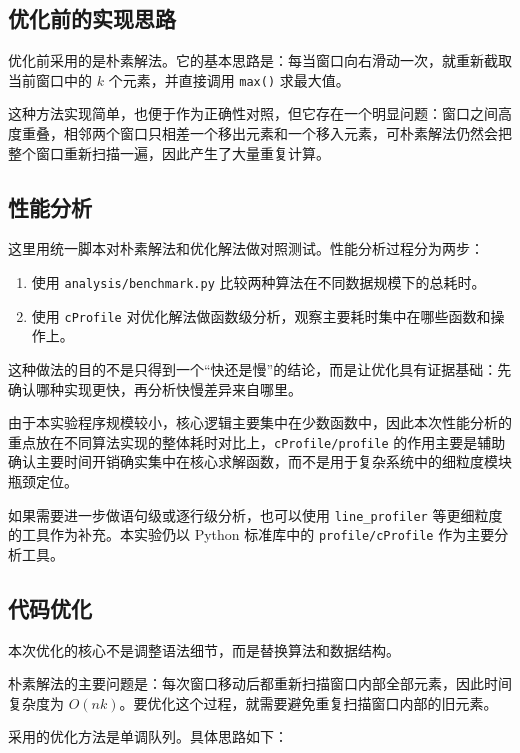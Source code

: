 \documentclass[a4paper,UTF8,fontset=none]{ctexart}
\begin{document}
\subsection{优化前的实现思路}

优化前采用的是朴素解法。它的基本思路是：每当窗口向右滑动一次，就重新截取当前窗口中的 $k$ 个元素，并直接调用 \texttt{max()} 求最大值。

这种方法实现简单，也便于作为正确性对照，但它存在一个明显问题：窗口之间高度重叠，相邻两个窗口只相差一个移出元素和一个移入元素，可朴素解法仍然会把整个窗口重新扫描一遍，因此产生了大量重复计算。

\subsection{性能分析}

这里用统一脚本对朴素解法和优化解法做对照测试。性能分析过程分为两步：

\begin{enumerate}
    \item 使用 \texttt{analysis/benchmark.py} 比较两种算法在不同数据规模下的总耗时。
    \item 使用 \texttt{cProfile} 对优化解法做函数级分析，观察主要耗时集中在哪些函数和操作上。
\end{enumerate}

这种做法的目的不是只得到一个“快还是慢”的结论，而是让优化具有证据基础：先确认哪种实现更快，再分析快慢差异来自哪里。

由于本实验程序规模较小，核心逻辑主要集中在少数函数中，因此本次性能分析的重点放在不同算法实现的整体耗时对比上，\texttt{cProfile/profile} 的作用主要是辅助确认主要时间开销确实集中在核心求解函数，而不是用于复杂系统中的细粒度模块瓶颈定位。

如果需要进一步做语句级或逐行级分析，也可以使用 \texttt{line\_profiler} 等更细粒度的工具作为补充。本实验仍以 Python 标准库中的 \texttt{profile/cProfile} 作为主要分析工具。

\subsection{代码优化}

本次优化的核心不是调整语法细节，而是替换算法和数据结构。

朴素解法的主要问题是：每次窗口移动后都重新扫描窗口内部全部元素，因此时间复杂度为 $O(nk)$。要优化这个过程，就需要避免重复扫描窗口内部的旧元素。

采用的优化方法是单调队列。具体思路如下：
\end{document}
